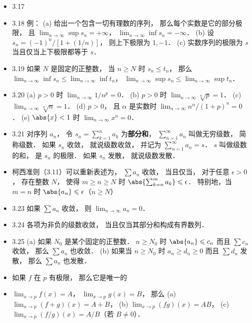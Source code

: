 \begin{itemize}
\item 3.17 

\item 3.18 例： (a) 给出一个包含一切有理数的序列， 那么每个实数是它的部分极限， 且 $\lim_{n\to\infty}\sup s_n = +\infty$， $\lim_{n\to\infty}\inf s_n = -\infty$． (b) 设 $s_n = (-1)^n/[1+(1/n)]$， 则上下极限为 $1,-1$． (c) 实数序列的极限为 $s$ 当且仅当上下极限都等于 $s$．

\item 3.19 如果 $N$ 是固定的正整数， 当 $n\geqslant N$ 时 $s_n \leqslant t_n$， 那么 $\lim_{n\to\infty}\inf s_n \leqslant \lim_{n\to\infty}\inf t_n$， $\lim_{n\to\infty}\sup s_n \leqslant \lim_{n\to\infty}\sup t_n$．

\item 3.20 (a) $p > 0$ 时 $\lim_{n\to\infty}1/n^p = 0$． (b) $p>0$ 时 $\lim_{n\to\infty}{}\sqrt[n]{p} = 1$． (c) $\lim_{n\to\infty} \sqrt[n]{n} = 1$． (d) $p>0$， 且 $\alpha$ 是实数时 $\lim_{n\to\infty} n^\alpha/(1+p)^n = 0$． (e) $\abs{x}<1$ 时 $\lim_{n\to\infty} x^n = 0$．

\item 3.21 对序列 ${a_n}$， 令 $s_n = \sum_{k=1}^n a_k$ 为\textbf{部分和}， $\sum_{n=1}^\infty a_n$ 叫做无穷级数， 简称级数． 如果 $s_n$ 收敛， 就说级数收敛， 并记为 $\sum_{n=1}^\infty a_n = s$． $s$ 叫做级数的和， 是 $s_n$ 的极限． 如果 $s_n$ 发散， 就说级数发散．

\item 柯西准则（3.11）可以重新表述为， $\sum a_n$ 收敛， 当且仅当， 对于任意 $\epsilon>0$， 存在整数 $N$， 使得 $m \geqslant n \geqslant N$ 时 $\abs{\sum_{k=n}^m a_k} \leqslant \epsilon$． 特别地，当 $m=n$ 时 $\abs{a_n}\leqslant\epsilon$（$n\geqslant N$）

\item 3.23 如果 $\sum a_n$ 收敛， 则 $\lim_{n\to\infty} a_n = 0$．

\item 3.24 各项为非负的级数收敛， 当且仅当其部分和构成有界数列．

\item 3.25 (a) 如果 $N_0$ 是某个固定的正整数． $n \geqslant N_0$ 时 $\abs{a_n}\leqslant c_n$ 而且 $\sum c_n$ 收敛， 那么 $\sum a_n$ 也收敛． (b) 如果当 $n\geqslant N_0$ 时 $a_n\geqslant d_n\geqslant 0$ 而且 $\sum d_n$ 发散， 那么 $\sum a_n$ 也发散．

\item 如果 $f$ 在 $p$ 有极限， 那么它是唯一的

\item $\lim_{x\to p}f(x)=A$， $\lim_{x\to p}g(x)=B$， 那么 (a) $\lim_{x\to p}(f+g)(x)=A+B$， (b) $\lim_{x\to p}(fg)(x)=AB$， (c) $\lim_{x\to p}(f/g)(x)=A/B$（若 $B\ne 0$）．
\end{itemize}


